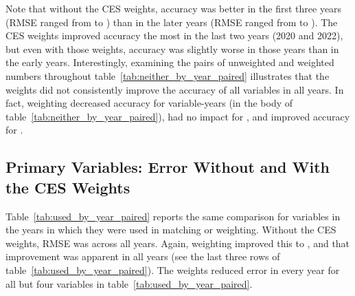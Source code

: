 \documentclass[12pt]{article}
\begin{document}
Note that without the CES weights, accuracy was better in the first three years (RMSE ranged from \NeitherMatchEarlyMin{} to \NeitherMatchEarlyMax{}) than in the later years (RMSE ranged from \NeitherMatchLateMin{} to \NeitherMatchLateMax{}). The CES weights improved accuracy the most in the last two years (2020 and 2022), but even with those weights, accuracy was slightly worse in those years than in the early years. Interestingly, examining the pairs of unweighted and weighted numbers throughout table~\ref{tab:neither_by_year_paired} illustrates that the weights did not consistently improve the accuracy of all variables in all years. In fact, weighting decreased accuracy for \NeitherCellsWorse{} variable-years (in the body of table~\ref{tab:neither_by_year_paired}), had no impact for \NeitherCellsSame{}, and improved accuracy for \NeitherCellsImproved{}.

\subsection{Primary Variables: Error Without and With the CES Weights}

Table~\ref{tab:used_by_year_paired} reports the same comparison for variables in the years in which they were used in matching or weighting. Without the CES weights, RMSE was \UsedMeanBefore{} across all years. Again, weighting improved this to \UsedMeanAfter{}, and that improvement was apparent in all years (see the last three rows of table~\ref{tab:used_by_year_paired}). The weights reduced error in every year for all but four variables in table~\ref{tab:used_by_year_paired}.


\end{document}

